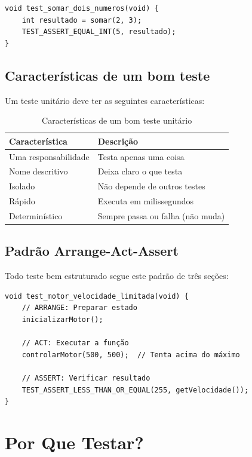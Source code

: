 \documentclass[12pt,a4paper]{article}
\begin{document}
\begin{lstlisting}[caption=Exemplo básico de teste unitário]
void test_somar_dois_numeros(void) {
    int resultado = somar(2, 3);
    TEST_ASSERT_EQUAL_INT(5, resultado);
}
\end{lstlisting}

\subsection{Características de um bom teste}

Um teste unitário deve ter as seguintes características:

\begin{table}[H]
\centering
\begin{tabular}{|l|p{8cm}|}
\toprule
\textbf{Característica} & \textbf{Descrição} \\
\midrule
Uma responsabilidade & Testa apenas uma coisa \\
Nome descritivo & Deixa claro o que testa \\
Isolado & Não depende de outros testes \\
Rápido & Executa em milissegundos \\
Determinístico & Sempre passa ou falha (não muda) \\
\bottomrule
\end{tabular}
\caption{Características de um bom teste unitário}
\end{table}

\subsection{Padrão Arrange-Act-Assert}

Todo teste bem estruturado segue este padrão de três seções:

\begin{lstlisting}[caption=Padrão AAA - Arrange-Act-Assert]
void test_motor_velocidade_limitada(void) {
    // ARRANGE: Preparar estado
    inicializarMotor();
    
    // ACT: Executar a função
    controlarMotor(500, 500);  // Tenta acima do máximo
    
    // ASSERT: Verificar resultado
    TEST_ASSERT_LESS_THAN_OR_EQUAL(255, getVelocidade());
}
\end{lstlisting}

\section{Por Que Testar?}
\end{document}
